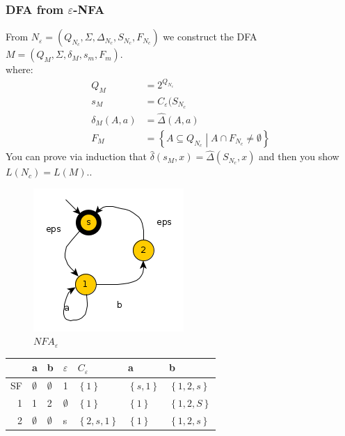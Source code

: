 \documentclass[a4paper]{article}
\begin{document}
        \subsubsection{DFA from $\varepsilon$-NFA}
        From $N_\varepsilon = \left( Q_{N_c}, \Sigma, \Delta_{N_c}, S_{N_c}, F_{N_c} \right)$
        we construct the DFA $M=\left(Q_M, \Sigma, \delta_M, s_m, F_m\right)$.\\
        where:
        \begin{align*}
            Q_M&=2^{Q_{N_c}}\\
            s_M&=C_\varepsilon(S_{N_c}\\
            \delta_M(A,a)&=\hat{\Delta}(A,a)\\
            F_M&=\left\{ A\subseteq Q_{N_c}\middle | A\cap F_{N_c} \neq \emptyset \right\}
        \end{align*}
        You can prove via induction that $\hat{\delta}(s_M,x)=\hat{\Delta}(S_{N_c},x)$
        and then you show $L(N_c)=L(M).$.
        \begin{figure}[H]
            \centering
            \includegraphics{nfaeps.png}
            \caption{$NFA_\varepsilon$}
            \label{fig:nfaeps}
        \end{figure}
        \begin{table}[H]
            \centering
            \begin{tabular}{r|l l|l|l| l l}
                & a & b & $\varepsilon$ & $C_\varepsilon$ & a & b\\\hline
                SF & $\emptyset$ & $\emptyset$ & 1 & $\left\{ 1 \right\}$ & $\left\{ s,1 \right\}$ & $\left\{  1,2,s\right\}$\\
                1 & 1 & 2 & $\emptyset$ & $\left\{ 1 \right\}$ &$\left\{ 1 \right\}$ & $\left\{ 1,2,S \right\}$\\
                2 & $\emptyset$ & $\emptyset$ & s & $\left\{ 2,s,1 \right\}$ & $\left\{ 1 \right\}$ & $\left\{ 1,2,s \right\}$
            \end{tabular}
        \end{table}
\end{document}
